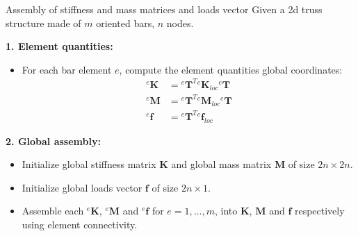 \documentclass[aspectratio=169]{beamer}
\begin{document}
{
\color{white}
\begin{frame}{Assembly of stiffness and mass matrices and loads vector}
  Given a 2d truss structure made of $m$ oriented bars, $n$ nodes.

  \vspace{0.5em}
  \textbf{1. Element quantities:}
  \begin{itemize}
    \item For each bar element $e$, compute the element quantities global coordinates:
          \begin{align*}
            {}^e\mathbf{K} & ={}^e\mathbf{T}^{T} {}^e\mathbf{K}_{loc}{}^e\mathbf{T} \\
            {}^e\mathbf{M} & ={}^e\mathbf{T}^{T} {}^e\mathbf{M}_{loc}{}^e\mathbf{T} \\
            {}^e\mathbf{f} & ={}^e\mathbf{T}^{T} {}^e\mathbf{f}_{loc}
          \end{align*}
  \end{itemize}

  \vspace{0.5em}
  \textbf{2. Global assembly:}
  \begin{itemize}
    \item Initialize global stiffness matrix $\mathbf{K}$ and global mass matrix $\mathbf{M}$ of size $2n \times 2n$.
    \item  Initialize global loads vector $\mathbf{f}$ of size $2n \times 1$.
    \item Assemble each ${}^e\mathbf{K}$, ${}^e\mathbf{M}$ and ${}^e\mathbf{f}$ for $e=1,\dots,m$, into $\mathbf{K}$, $\mathbf{M}$ and $\mathbf{f}$ respectively using element connectivity.
  \end{itemize}
\end{frame}
}
\end{document}

